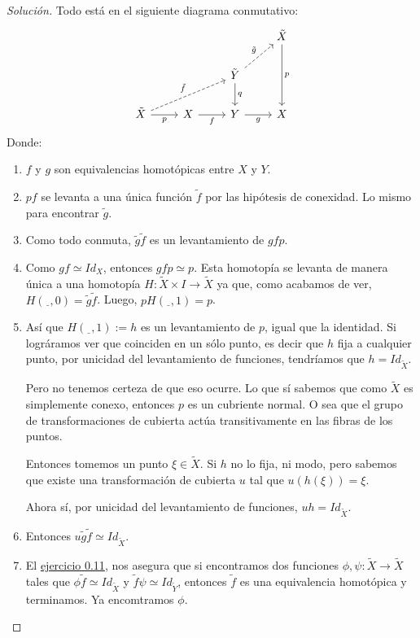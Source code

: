 \documentclass[spanish]{book}
\theoremstyle{definition}
\begin{document}
\begin{proof}[Solución]
	Todo está en el siguiente diagrama conmutativo:
	\[\begin{tikzcd}
		&&&\tilde{X}\arrow[dd,"p"]\\
		&&\tilde{Y}\arrow[d,"q"]\arrow[ru,dashed,"\tilde{g}"]\\
		\tilde{X}\arrow[rru,dashed,"\tilde{f}"]\arrow[r,swap,"p"]&X\arrow[r,swap,"f"]&Y\arrow[r,swap,"g"]&X
	\end{tikzcd}\]
	Donde:
	\begin{enumerate}
		\item $f$ y $g$ son equivalencias homotópicas entre $X$ y $Y$.
		\item $pf$ se levanta a una única función $\tilde{f}$ por las hipótesis de conexidad. Lo mismo para encontrar $\tilde{g}$.
		\item Como todo conmuta, $\tilde{g}\tilde{f}$ es un levantamiento de $gfp$.
		\item Como $gf\simeq Id_X$, entonces $gfp\simeq p$. Esta homotopía se levanta de manera única a una homotopía $H:\tilde{X}\times I\to\tilde{X}$ ya que, como acabamos de ver, $H(\underline{\hspace{5pt}},0)=\tilde{g}\tilde{f}$. Luego, $pH(\underline{\hspace{5pt}},1)=p$.
		\item Así que $H(\underline{\hspace{5pt}},1):=h$ es un levantamiento de $p$, igual que la identidad. Si lográramos ver que coinciden en un sólo punto, es decir que $h$ fija a cualquier punto, por unicidad del levantamiento de funciones, tendríamos que $h=Id_{\tilde{X}}$.
		
		Pero no tenemos certeza de que eso ocurre. Lo que sí sabemos que como $\tilde{X}$ es simplemente conexo, entonces $p$ es un cubriente normal. O sea que el grupo de transformaciones de cubierta actúa transitivamente en las fibras de los puntos.
		
		Entonces tomemos un punto $\xi\in\tilde{X}$. Si $h$ no lo fija, ni modo, pero sabemos que existe una transformación de cubierta $u$ tal que $u(h(\xi))=\xi$.
		
		Ahora sí, por unicidad del levantamiento de funciones, $uh= Id_{\tilde{X}}$.
		\item Entonces $u\tilde{g}\tilde{f}\simeq Id_{\tilde{X}}$.
		\item El \hyperref[hatcher:0.11]{ ejercicio 0.11}, nos asegura que si encontramos dos funciones $\phi,\psi:\tilde{X}\to\tilde{X}$ tales que $\phi\tilde{f}\simeq Id_{\tilde{X}}$ y $\tilde{f}\psi\simeq Id_{\tilde{Y}}$, entonces $\tilde{f}$ es una equivalencia homotópica y terminamos. Ya encomtramos $\phi$.
		

\end{enumerate}
\end{proof}
\end{document}
